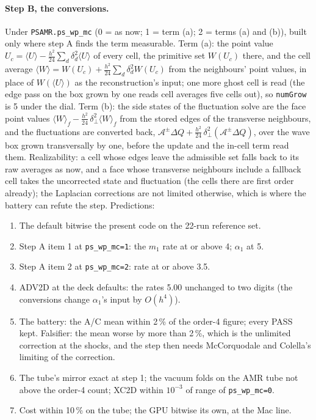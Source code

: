 \documentclass[11pt,a4paper]{article}
\newcommand{\code}[1]{\texttt{\small #1}}
\begin{document}
\paragraph{Step B, the conversions.}  Under \code{PSAMR.ps\_wp\_mc}
(0 = as now; 1 = term (a); 2 = terms (a) and (b)), built only where
step A finds the term measurable.  Term (a): the point value
$U_c = \langle U\rangle - \tfrac{h^2}{24}\sum_d \delta_d^2\langle U\rangle$
of every cell, the primitive set $W(U_c)$ there, and the cell average
$\langle W\rangle = W(U_c) + \tfrac{h^2}{24}\sum_d \delta_d^2 W(U_c)$
from the neighbours' point values, in place of $W(\langle U\rangle)$ as
the reconstruction's input; one more ghost cell is read (the edge pass
on the box grown by one reads cell averages five cells out), so
\code{numGrow} is 5 under the dial.  Term (b): the side states of the
fluctuation solve are the face point values
$\langle W\rangle_f - \tfrac{h^2}{24}\,\delta_\perp^2\langle W\rangle_f$
from the stored edges of the transverse neighbours, and the
fluctuations are converted back,
$\mathcal{A}^\pm\Delta Q + \tfrac{h^2}{24}\,\delta_\perp^2(\mathcal{A}^\pm\Delta Q)$,
over the wave box grown transversally by one, before the update and the
in-cell term read them.  Realizability: a cell whose edges leave the
admissible set falls back to its raw averages as now, and a face whose
transverse neighbours include a fallback cell takes the uncorrected
state and fluctuation (the cells there are first order already); the
Laplacian corrections are not limited otherwise, which is where the
battery can refute the step.  Predictions:
\begin{enumerate}[nosep]
\item The default bitwise the present code on the 22-run reference set.
\item Step A item 1 at \code{ps\_wp\_mc=1}: the $m_1$ rate at or above
      4; $\alpha_1$ at 5.
\item Step A item 2 at \code{ps\_wp\_mc=2}: rate at or above 3.5.
\item ADV2D at the deck defaults: the rates 5.00 unchanged to two
      digits (the conversions change $\alpha_1$'s input by $O(h^4)$).
\item The battery: the A/C mean within 2\,\% of the order-4 figure;
      every PASS kept.  Falsifier: the mean worse by more than 2\,\%,
      which is the unlimited correction at the shocks, and the step
      then needs McCorquodale and Colella's limiting of the correction.
\item The tube's mirror exact at step 1; the vacuum folds on the AMR
      tube not above the order-4 count; XC2D within $10^{-3}$ of range
      of \code{ps\_wp\_mc=0}.
\item Cost within 10\,\% on the tube; the GPU bitwise its own, at the
      Mac line.
\end{enumerate}
\end{document}

